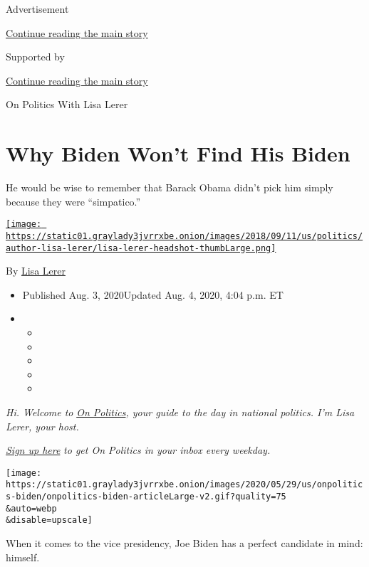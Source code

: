 Advertisement

\protect\hyperlink{after-top}{Continue reading the main story}

Supported by

\protect\hyperlink{after-sponsor}{Continue reading the main story}

On Politics With Lisa Lerer

\hypertarget{why-biden-wont-find-his-biden}{%
\section{Why Biden Won't Find His
Biden}\label{why-biden-wont-find-his-biden}}

He would be wise to remember that Barack Obama didn't pick him simply
because they were ``simpatico.''

\href{https://www.nytimes3xbfgragh.onion/by/lisa-lerer}{\texttt{[image: https://static01.graylady3jvrrxbe.onion/images/2018/09/11/us/politics/author-lisa-lerer/lisa-lerer-headshot-thumbLarge.png]}}

By \href{https://www.nytimes3xbfgragh.onion/by/lisa-lerer}{Lisa Lerer}

\begin{itemize}
\item
  Published Aug. 3, 2020Updated Aug. 4, 2020, 4:04 p.m. ET
\item
  \begin{itemize}
  \item
  \item
  \item
  \item
  \item
  \end{itemize}
\end{itemize}

\emph{Hi. Welcome to}
\href{https://www.nytimes3xbfgragh.onion/spotlight/on-politics}{\emph{On
Politics}}\emph{, your guide to the day in national politics. I'm Lisa
Lerer, your host.}

\href{https://www.nytimes3xbfgragh.onion/newsletters/politics?module=inline}{\emph{Sign
up here}} \emph{to get On Politics in your inbox every weekday.}

\texttt{[image: https://static01.graylady3jvrrxbe.onion/images/2020/05/29/us/onpolitics-biden/onpolitics-biden-articleLarge-v2.gif?quality=75\\\&auto=webp\\\&disable=upscale]}

When it comes to the vice presidency, Joe Biden has a perfect candidate
in mind: himself.

